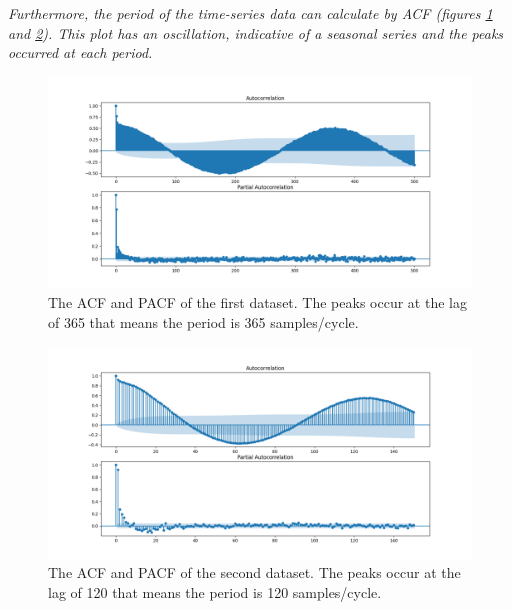 \textit{Furthermore, the period of the time-series data can calculate by \gls{ACF} (figures \ref{fig:Ass1_D1_PACF_ACF_series} and \ref{fig:Ass1_D2_PACF_ACF_series}). This plot has an oscillation, indicative of a seasonal series and the peaks occurred at each period. }

\begin{figure}[H]
    \centering
    \begin{minipage}[b]{1\textwidth}
        \includegraphics[width=\textwidth]{figures/Ass1/Ass1_D1_PACF_ACF_series.png}
    \end{minipage}
    \caption{The \gls{ACF} and \gls{PACF} of the first dataset. The peaks occur at the lag of 365 that means the period is 365 samples/cycle.}
    \label{fig:Ass1_D1_PACF_ACF_series}
\end{figure}

\begin{figure}[H]
    \centering
    \begin{minipage}[b]{1\textwidth}
        \includegraphics[width=\textwidth]{figures/Ass1/Ass1_D2_PACF_ACF_series.png}
    \end{minipage}
    \caption{The \gls{ACF} and \gls{PACF} of the second dataset. The peaks occur at the lag of 120 that means the period is 120 samples/cycle.}
    \label{fig:Ass1_D2_PACF_ACF_series}
\end{figure}


